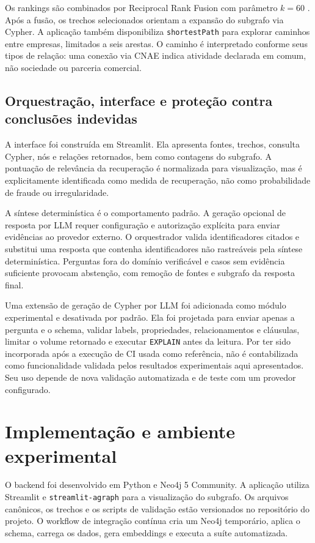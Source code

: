 \documentclass[12pt]{article}
\begin{document}
Os rankings são combinados por Reciprocal Rank Fusion com parâmetro $k=60$ \cite{cormack2009}. Após a fusão, os trechos selecionados orientam a expansão do subgrafo via Cypher. A aplicação também disponibiliza \texttt{shortestPath} para explorar caminhos entre empresas, limitados a seis arestas. O caminho é interpretado conforme seus tipos de relação: uma conexão via CNAE indica atividade declarada em comum, não sociedade ou parceria comercial.

\subsection{Orquestração, interface e proteção contra conclusões indevidas}

A interface foi construída em Streamlit. Ela apresenta fontes, trechos, consulta Cypher, nós e relações retornados, bem como contagens do subgrafo. A pontuação de relevância da recuperação é normalizada para visualização, mas é explicitamente identificada como medida de recuperação, não como probabilidade de fraude ou irregularidade.

A síntese determinística é o comportamento padrão. A geração opcional de resposta por LLM requer configuração e autorização explícita para enviar evidências ao provedor externo. O orquestrador valida identificadores citados e substitui uma resposta que contenha identificadores não rastreáveis pela síntese determinística. Perguntas fora do domínio verificável e casos sem evidência suficiente provocam abstenção, com remoção de fontes e subgrafo da resposta final.

Uma extensão de geração de Cypher por LLM foi adicionada como módulo experimental e desativada por padrão. Ela foi projetada para enviar apenas a pergunta e o schema, validar labels, propriedades, relacionamentos e cláusulas, limitar o volume retornado e executar \texttt{EXPLAIN} antes da leitura. Por ter sido incorporada após a execução de CI usada como referência, não é contabilizada como funcionalidade validada pelos resultados experimentais aqui apresentados. Seu uso depende de nova validação automatizada e de teste com um provedor configurado.

\section{Implementação e ambiente experimental}

O backend foi desenvolvido em Python e Neo4j 5 Community. A aplicação utiliza Streamlit e \texttt{streamlit-agraph} para a visualização do subgrafo. Os arquivos canônicos, os trechos e os scripts de validação estão versionados no repositório do projeto. O workflow de integração contínua cria um Neo4j temporário, aplica o schema, carrega os dados, gera embeddings e executa a suíte automatizada.
\end{document}
